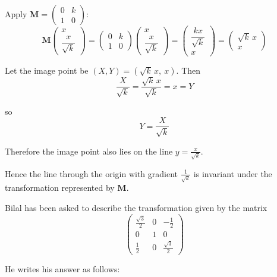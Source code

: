 \documentclass[leqno]{article}
\begin{document}
\begin{enumerate}[
  label=\textbf{\arabic*.},
  leftmargin=*,
  topsep=0pt,
  partopsep=0pt,
  parsep=0pt
]
\begin{djsSolution}
\begin{enumerate}[label=\textbf{(\alph*)}]
  Apply $\mathbf{M}=\begin{pmatrix}0&k\\1&0\end{pmatrix}$:
  \[
  \mathbf{M}
  \begin{pmatrix}
  x\\[2pt]
  \dfrac{x}{\sqrt{k}}
  \end{pmatrix}
  =
  \begin{pmatrix}
  0 & k\\
  1 & 0
  \end{pmatrix}
  \begin{pmatrix}
  x\\[2pt]
  \dfrac{x}{\sqrt{k}}
  \end{pmatrix}
  =
  \begin{pmatrix}
  \dfrac{kx}{\sqrt{k}}\\[4pt]
  x
  \end{pmatrix}
  =
  \begin{pmatrix}
  \sqrt{k}\,x\\
  x
  \end{pmatrix}
  \]

  Let the image point be $(X,Y)=(\sqrt{k}\,x,\ x)$. Then
  \[
  \frac{X}{\sqrt{k}}=\frac{\sqrt{k}\,x}{\sqrt{k}}=x=Y
  \]

  so
  \[
  Y=\frac{X}{\sqrt{k}}
  \]

  Therefore the image point also lies on the line $y=\frac{x}{\sqrt{k}}$.

  Hence the line through the origin with gradient $\frac{1}{\sqrt{k}}$ is invariant under the transformation represented by $\mathbf{M}$.
\end{enumerate}
\end{djsSolution}


\newpage

\questionitem

Bilal has been asked to describe the transformation given by the matrix
\[
\begin{pmatrix}
\frac{\sqrt{3}}{2} & 0 & -\frac{1}{2} \\
0 & 1 & 0 \\
\frac{1}{2} & 0 & \frac{\sqrt{3}}{2}
\end{pmatrix}
\]

He writes his answer as follows: \\


 \\[10pt]


\end{enumerate}
\end{document}
